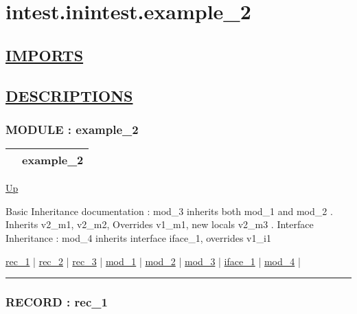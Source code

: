\chapter*{intest.inintest.example\_2}
\hypertarget{ecldoc:toc:intest.inintest.example_2}{}

\section*{\underline{IMPORTS}}

\section*{\underline{DESCRIPTIONS}}
\subsection*{MODULE : example\_2}
\hypertarget{ecldoc:intest.inintest.example_2}{}

{\renewcommand{\arraystretch}{1.5}
\begin{tabularx}{\textwidth}{|>{\raggedright\arraybackslash}l|X|}
\hline
\hspace{0pt} & example\_2 \\
\hline
\end{tabularx}
}

\hyperlink{ecldoc:toc:intest/inintest}{Up}

\par
Basic Inheritance documentation : mod\_3 inherits both mod\_1 and mod\_2 . Inherits v2\_m1, v2\_m2, Overrides v1\_m1, new locals v2\_m3 . Interface Inheritance : mod\_4 inherits interface iface\_1, overrides v1\_i1


\hyperlink{ecldoc:intest.inintest.example_2.rec_1}{rec\_1}  |
\hyperlink{ecldoc:intest.inintest.example_2.rec_2}{rec\_2}  |
\hyperlink{ecldoc:intest.inintest.example_2.rec_3}{rec\_3}  |
\hyperlink{ecldoc:intest.inintest.example_2.mod_1}{mod\_1}  |
\hyperlink{ecldoc:intest.inintest.example_2.mod_2}{mod\_2}  |
\hyperlink{ecldoc:intest.inintest.example_2.mod_3}{mod\_3}  |
\hyperlink{ecldoc:intest.inintest.example_2.iface_1}{iface\_1}  |
\hyperlink{ecldoc:intest.inintest.example_2.mod_4}{mod\_4}  |

\rule{\textwidth}{0.4pt}

\subsection*{RECORD : rec\_1}
\hypertarget{ecldoc:intest.inintest.example_2.rec_1}{}

